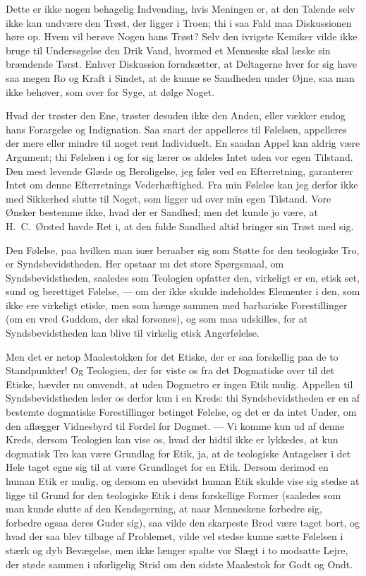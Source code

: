 \documentclass[12pt,a4paper]{article}
\newcommand{\apage}[1]{\marginnote{\footnotesize\textit{[#1]}}}
\begin{document}
Dette er ikke nogen behagelig Indvending, hvis Meningen er, at den Talende selv ikke
kan undvære den Trøst, der ligger i Troen; thi i saa Fald maa Diskussionen høre op.
Hvem vil berøve Nogen hans Trøst? \apage{213} Selv den ivrigste Kemiker vilde ikke bruge til
Undersøgelse den Drik Vand, hvormed et Menneske skal læske sin brændende Tørst.
Enhver Diskussion forudsætter, at Deltagerne hver for sig have saa megen Ro og Kraft
i Sindet, at de kunne se Sandheden under Øjne, saa man ikke behøver, som over for
Syge, at dølge Noget.

Hvad der trøster den Ene, trøster desuden ikke den Anden, eller vækker endog hans
Forargelse og Indignation. Saa snart der appelleres til Følelsen, appelleres der mere
eller mindre til noget rent Individuelt. En saadan Appel kan aldrig være Argument;
thi Følelsen i og for sig lærer os aldeles Intet uden vor egen Tilstand. Den mest
levende Glæde og Beroligelse, jeg føler ved en Efterretning, garanterer Intet om
denne Efterretnings Vederhæftighed. Fra min Følelse kan jeg derfor ikke med Sikkerhed
slutte til Noget, som ligger ud over min egen Tilstand. Vore Ønsker bestemme ikke,
hvad der er Sandhed; men det kunde jo være, at H.\ C.\ Ørsted havde Ret i, at den
fulde Sandhed altid bringer sin Trøst med sig.

Den Følelse, paa hvilken man især beraaber sig som Støtte for den teologiske Tro, er
Syndsbevidstheden. Her opstaar nu det store Spørgsmaal, om Syndsbevidstheden,
saaledes som Teologien opfatter den, virkeligt er en, etisk set, sund og berettiget
Følelse, --- om der ikke skulde indeholdes Elementer i den, som ikke ere virkeligt
etiske, men som hænge sammen med barbariske Forestillinger (om en vred Guddom, der
skal forsones), og som maa udskilles, for at Syndsbevidstheden kan blive til virkelig
etisk Angerfølelse.

Men det er netop Maalestokken for det Etiske, der er saa forskellig paa de to
Standpunkter! Og Teologien, der før viste os fra det Dogmatiske over til det Etiske,
hævder nu omvendt, at uden Dogmetro er ingen Etik mulig. Appellen til
Syndsbevidstheden leder os derfor kun i en Kreds: thi Syndsbevidstheden er en af
bestemte dogmatiske Forestillinger betinget Følelse, og det er da intet Under, om den
aflægger Vidnesbyrd til Fordel for Dogmet. --- Vi komme kun ud af denne Kreds, dersom
Teologien kan vise \apage{214} os, hvad der hidtil ikke er lykkedes, at kun dogmatisk Tro kan
være Grundlag for Etik, ja, at de teologiske Antagelser i det Hele taget egne sig til
at være Grundlaget for en Etik. Dersom derimod en human Etik er mulig, og dersom en
ubevidst human Etik skulde vise sig stedse at ligge til Grund for den teologiske Etik
i dens forskellige Former (saaledes som man kunde slutte af den Kendsgerning, at naar
Menneskene forbedre sig, forbedre ogsaa deres Guder sig), saa vilde den skarpeste Brod
være taget bort, og hvad der saa blev tilbage af Problemet, vilde vel stedse kunne
sætte Følelsen i stærk og dyb Bevægelse, men ikke længer spalte vor Slægt i to
modsatte Lejre, der støde sammen i uforligelig Strid om den sidste Maalestok for Godt
og Ondt.
\end{document}
